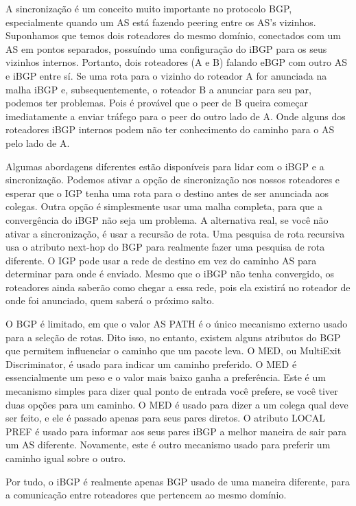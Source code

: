 \documentclass[12pt,a4paper]{report}
\begin{document}
A sincroniza\c{c}\~ao \'e um conceito muito importante no protocolo BGP, especialmente quando um AS est\'a fazendo peering entre os AS's vizinhos. Suponhamos que temos dois roteadores do mesmo dom\'inio, conectados com um AS em pontos separados, possu\'indo uma configura\c{c}\~ao do iBGP para os seus vizinhos internos. Portanto, dois roteadores (A e B) falando eBGP com outro AS e iBGP entre s\'i. Se uma rota para o vizinho do roteador A for anunciada na malha iBGP e, subsequentemente, o roteador B a anunciar para seu par, podemos ter problemas. Pois \'e prov\'avel que o peer de B queira come\c{c}ar imediatamente a enviar tr\'afego para o peer do outro lado de A. Onde alguns dos roteadores iBGP internos podem n\~ao ter conhecimento do caminho para o AS pelo lado de A.

Algumas abordagens diferentes est\~ao dispon\'iveis para lidar com o iBGP e a sincroniza\c{c}\~ao. Podemos ativar a op\c{c}\~ao de sincroniza\c{c}\~ao nos nossos roteadores e esperar que o IGP tenha uma rota para o destino antes de ser anunciada aos colegas. Outra op\c{c}\~ao \'e simplesmente usar uma malha completa, para que a converg\^encia do iBGP n\~ao seja um problema. A alternativa real, se voc\^e n\~ao ativar a sincroniza\c{c}\~ao, \'e usar a recurs\~ao de rota. Uma pesquisa de rota recursiva usa o atributo next-hop do BGP para realmente fazer uma pesquisa de rota diferente. O IGP pode usar a rede de destino em vez do caminho AS para determinar para onde \'e enviado. Mesmo que o iBGP n\~ao tenha convergido, os roteadores ainda saber\~ao como chegar a essa rede, pois ela existir\'a no roteador de onde foi anunciado, quem saber\'a o pr\'oximo salto.

O BGP \'e limitado, em que o valor AS PATH \'e o \'unico mecanismo externo usado para a sele\c{c}\~ao de rotas. Dito isso, no entanto, existem alguns atributos do BGP que permitem influenciar o caminho que um pacote leva. O MED, ou MultiExit Discriminator, \'e usado para indicar um caminho preferido. O MED \'e essencialmente um peso e o valor mais baixo ganha a prefer\^encia. Este \'e um mecanismo simples para dizer qual ponto de entrada voc\^e prefere, se voc\^e tiver duas op\c{c}\~oes para um caminho. O MED \'e usado para dizer a um colega qual deve ser feito, e ele \'e passado apenas para seus pares diretos. O atributo LOCAL PREF \'e usado para informar aos seus pares iBGP a melhor maneira de sair para um AS diferente. Novamente, este \'e outro mecanismo usado para preferir um caminho igual sobre o outro.

Por tudo, o iBGP \'e realmente apenas BGP usado de uma maneira diferente, para a comunica\c{c}\~ao entre roteadores que pertencem ao mesmo dom\'inio.  
\end{document}

